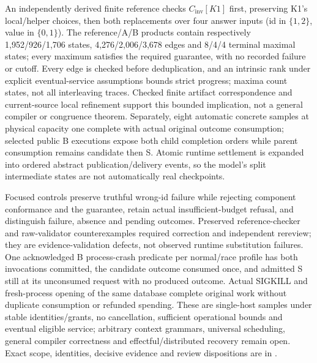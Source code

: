 \documentclass[11pt,a4paper]{article}
\theoremstyle{definition}
\theoremstyle{remark}
\begin{document}
An independently derived finite reference checks $C_{\mathrm{inv}}[K1]$ first, preserving K1's local/helper choices, then both replacements over four answer inputs (id in $\{1,2\}$, value in $\{0,1\}$). The reference/A/B products contain respectively 1,952/926/1,706 states, 4,276/2,006/3,678 edges and 8/4/4 terminal maximal states; every maximum satisfies the required guarantee, with no recorded failure or cutoff. Every edge is checked before deduplication, and an intrinsic rank under explicit eventual-service assumptions bounds strict progress; maxima count states, not all interleaving traces. Checked finite artifact correspondence and current-source local refinement support this bounded implication, not a general compiler or congruence theorem. Separately, eight automatic concrete samples at physical capacity one complete with actual original outcome consumption; selected public B executions expose both child completion orders while parent consumption remains candidate then S. Atomic runtime settlement is expanded into ordered abstract publication/delivery events, so the model's split intermediate states are not automatically real checkpoints.

Focused controls preserve truthful wrong-id failure while rejecting component conformance and the guarantee, retain actual insufficient-budget refusal, and distinguish failure, absence and pending outcomes. Preserved reference-checker and raw-validator counterexamples required correction and independent rereview; they are evidence-validation defects, not observed runtime substitution failures. One acknowledged B process-crash predicate per normal/race profile has both invocations committed, the candidate outcome consumed once, and admitted S still at its unconsumed request with no produced outcome. Actual SIGKILL and fresh-process opening of the same database complete original work without duplicate consumption or refunded spending. These are single-host samples under stable identities/grants, no cancellation, sufficient operational bounds and eventual eligible service; arbitrary context grammars, universal scheduling, general compiler correctness and effectful/distributed recovery remain open. Exact scope, identities, decisive evidence and review dispositions are in .
\end{document}
